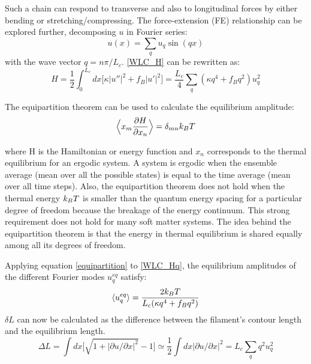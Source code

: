Such a chain can respond to transverse and also to longitudinal forces by either
bending or stretching/compressing.  The force-extension
(FE) relationship can be explored further, decomposing $u$ in Fourier series:
\begin{equation}\label{WLC_ufourier}
u(x)=\sum_q u_q \sin(qx)
\end{equation}
with the wave vector $q=n\pi/L_c$. \ref{WLC_H} can be rewritten as:
\begin{equation}\label{WLC_Hq}
H=\frac{1}{2}\int_0^{L_c} dx\Big[\kappa|u''|^2 + f_B|u'|^2\Big] =
\frac{L_c}{4}\sum_q (\kappa q^4 + f_Bq^2)u_q^2
\end{equation}

The equipartition theorem can be used to calculate the equilibrium amplitude:
\begin{equation}\label{equipartition}
\Big\langle x_m\frac{\partial H}{\partial x_n} \Big\rangle= \delta_{mn}k_B{}T
\end{equation}

where H is the Hamiltonian or energy function and $x_n$ corresponds to the
thermal equilibrium for an ergodic system. A system is ergodic when
the ensemble average (mean over all the possible states) is equal to the time average (mean over all time
steps). Also, the equipartition theorem does not hold when the
thermal energy $k_B{}T$ is smaller than the quantum energy spacing for a
particular degree of freedom because the breakage of the energy continuum. This
strong requirement does not hold for many soft matter systems. The idea behind
the equipartition theorem is that the energy in thermal equilibrium is shared
equally among all its degrees of freedom.

Applying equation \ref{equipartition} to \ref{WLC_Hq}, the equilibrium
amplitudes of the different Fourier modes $u_q^{eq} $ satisfy:
\begin{equation}\label{equipartition_uq}
\langle u_q^{eq}\rangle=\frac{2k_B{}T}{L_c(\kappa{}q^4+f_Bq^2)}
\end{equation}
$\delta L$ can now be calculated as the difference between the filament's contour
length and the equilibrium length.
\begin{equation}\label{deltaL}
\Delta L= \int dx \Big[ \sqrt{1+|\partial u/\partial x|^2} -1\Big]\simeq
\frac{1}{2} \int dx |\partial u/\partial x|^2 = L_c \sum_q q^2 u_q^2
\end{equation}

